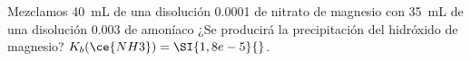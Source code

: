 Mezclamos \SI{40}{\milli\liter} de una disolución \SI{0,0001}{\Molar} de nitrato de magnesio con \SI{35}{\milli\liter} de una disolución \SI{0,003}{\Molar} de amoníaco ¿Se producirá la precipitación del hidróxido de magnesio? $K_b(\ce{NH3}) = \SI{1,8e-5}{}$.
